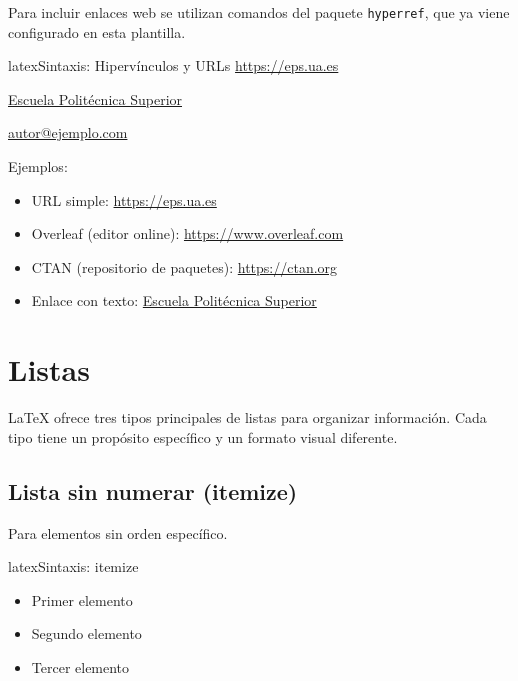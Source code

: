 Para incluir enlaces web se utilizan comandos del paquete \texttt{hyperref},
que ya viene configurado en esta plantilla.

\begin{codigosimple}{latex}{Sintaxis: Hipervínculos y URLs}
\url{https://eps.ua.es}

\href{https://eps.ua.es}{Escuela Politécnica Superior}

\href{mailto:autor@ejemplo.com}{autor@ejemplo.com}
\end{codigosimple}

Ejemplos:

\begin{itemize}
  \item URL simple: \url{https://eps.ua.es}
  \item Overleaf (editor online): \url{https://www.overleaf.com}
  \item CTAN (repositorio de paquetes): \url{https://ctan.org}
  \item Enlace con texto: \href{https://eps.ua.es}{Escuela Politécnica Superior}
\end{itemize}

\section{Listas}
\label{sec:listas}

\LaTeX{} ofrece tres tipos principales de listas para organizar información.
Cada tipo tiene un propósito específico y un formato visual diferente.

\subsection{Lista sin numerar (itemize)}

Para elementos sin orden específico.

\begin{codigosimple}{latex}{Sintaxis: itemize}
\begin{itemize}
  \item Primer elemento
  \item Segundo elemento
  \item Tercer elemento
\end{itemize}
\end{codigosimple}

